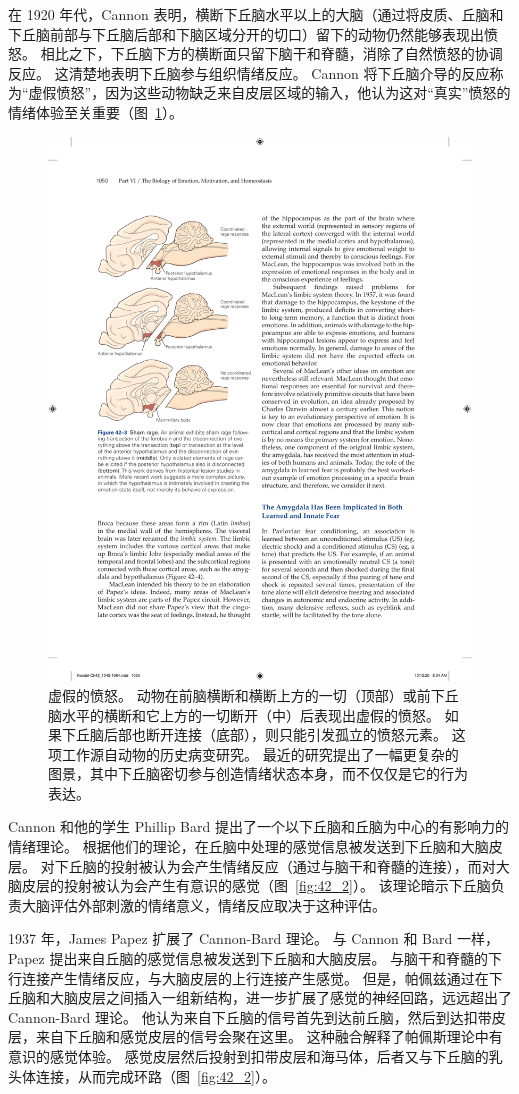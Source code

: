 在 1920 年代，Cannon 表明，横断下丘脑水平以上的大脑（通过将皮质、丘脑和下丘脑前部与下丘脑后部和下脑区域分开的切口）留下的动物仍然能够表现出愤怒。
相比之下，下丘脑下方的横断面只留下脑干和脊髓，消除了自然愤怒的协调反应。
这清楚地表明下丘脑参与组织情绪反应。
Cannon 将下丘脑介导的反应称为“虚假愤怒”，因为这些动物缺乏来自皮层区域的输入，他认为这对“真实”愤怒的情绪体验至关重要（图~\ref{fig:42_3}）。


\begin{figure}[htbp]
	\centering
	\includegraphics[width=0.5\linewidth]{chap42/fig_42_3}
	\caption{虚假的愤怒。 动物在前脑横断和横断上方的一切（顶部）或前下丘脑水平的横断和它上方的一切断开（中）后表现出虚假的愤怒。 如果下丘脑后部也断开连接（底部），则只能引发孤立的愤怒元素。 这项工作源自动物的历史病变研究。 最近的研究提出了一幅更复杂的图景，其中下丘脑密切参与创造情绪状态本身，而不仅仅是它的行为表达。}
	\label{fig:42_3}
\end{figure}


Cannon 和他的学生 Phillip Bard 提出了一个以下丘脑和丘脑为中心的有影响力的情绪理论。
根据他们的理论，在丘脑中处理的感觉信息被发送到下丘脑和大脑皮层。
对下丘脑的投射被认为会产生情绪反应（通过与脑干和脊髓的连接），而对大脑皮层的投射被认为会产生有意识的感觉（图~\ref{fig:42_2}）。
该理论暗示下丘脑负责大脑评估外部刺激的情绪意义，情绪反应取决于这种评估。


1937 年，James Papez 扩展了 Cannon-Bard 理论。 与 Cannon 和 Bard 一样，Papez 提出来自丘脑的感觉信息被发送到下丘脑和大脑皮层。
与脑干和脊髓的下行连接产生情绪反应，与大脑皮层的上行连接产生感觉。
但是，帕佩兹通过在下丘脑和大脑皮层之间插入一组新结构，进一步扩展了感觉的神经回路，远远超出了 Cannon-Bard 理论。
他认为来自下丘脑的信号首先到达前丘脑，然后到达扣带皮层，来自下丘脑和感觉皮层的信号会聚在这里。
这种融合解释了帕佩斯理论中有意识的感觉体验。
感觉皮层然后投射到扣带皮层和海马体，后者又与下丘脑的乳头体连接，从而完成环路（图~\ref{fig:42_2}）。


